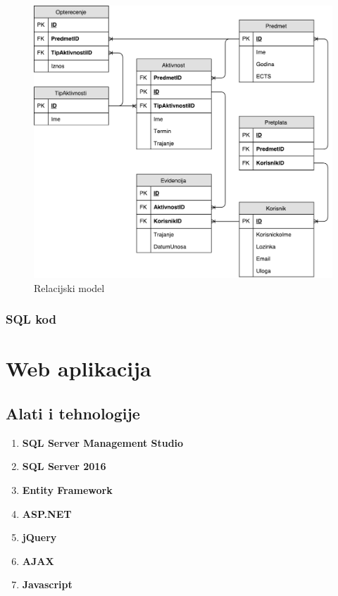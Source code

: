 \documentclass[times, utf8, zavrsni, numeric]{fer}
\begin{document}
\begin{figure}[H]
\centering
\includegraphics[scale=0.6]{img/relacijski-model.pdf}
\caption{Relacijski model}
\label{fig:relacijski-model}
\end{figure}

\subsection{SQL kod}
\lstset{language=SQL, tabsize=2}


\chapter{Web aplikacija}
\section{Alati i tehnologije}
\begin{enumerate}
\item \textbf{SQL Server Management Studio}
\item \textbf{SQL Server 2016}
\item \textbf{Entity Framework}
\item \textbf{ASP.NET}
\item \textbf{jQuery}
\item \textbf{AJAX}
\item \textbf{Javascript}
\end{enumerate}
\end{document}
